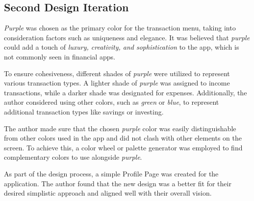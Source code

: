 
\subsection{Second Design Iteration}


\textit{Purple} was chosen as the primary color for the transaction menu, taking into consideration factors such as uniqueness and elegance. It was believed that \textit{purple} could add a touch of \textit{luxury, creativity, and sophistication} to the app, which is not commonly seen in financial apps.

To ensure cohesiveness, different shades of \textit{purple} were utilized to represent various transaction types. A lighter shade of \textit{purple} was assigned to income transactions, while a darker shade was designated for expenses. Additionally, the author considered using other colors, such as \textit{green} or \textit{blue}, to represent additional transaction types like savings or investing.

The author made sure that the chosen \textit{purple} color was easily distinguishable from other colors used in the app and did not clash with other elements on the screen. To achieve this, a color wheel or palette generator was employed to find complementary colors to use alongside \textit{purple}.

As part of the design process, a simple Profile Page was created for the application. The author found that the new design was a better fit for their desired simplistic approach and aligned well with their overall vision.


